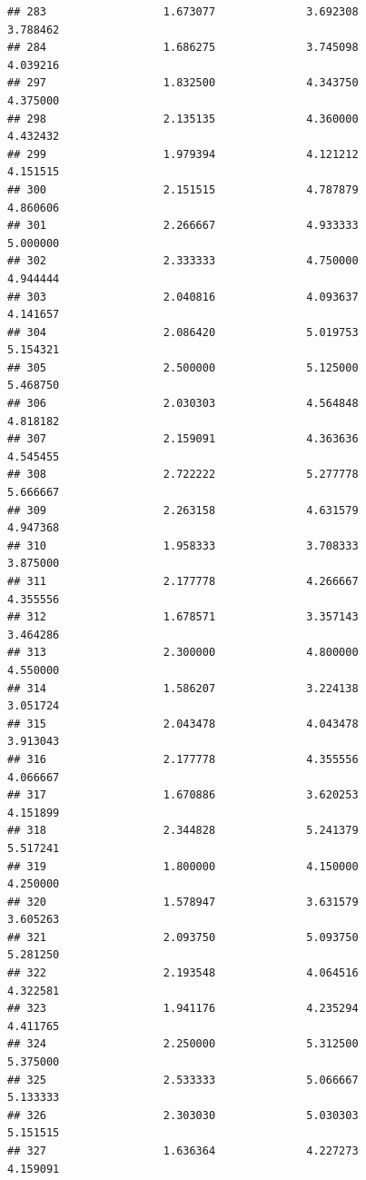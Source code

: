 \documentclass[]{article}
\begin{document}
\begin{verbatim}
## 283                  1.673077              3.692308                3.788462
## 284                  1.686275              3.745098                4.039216
## 297                  1.832500              4.343750                4.375000
## 298                  2.135135              4.360000                4.432432
## 299                  1.979394              4.121212                4.151515
## 300                  2.151515              4.787879                4.860606
## 301                  2.266667              4.933333                5.000000
## 302                  2.333333              4.750000                4.944444
## 303                  2.040816              4.093637                4.141657
## 304                  2.086420              5.019753                5.154321
## 305                  2.500000              5.125000                5.468750
## 306                  2.030303              4.564848                4.818182
## 307                  2.159091              4.363636                4.545455
## 308                  2.722222              5.277778                5.666667
## 309                  2.263158              4.631579                4.947368
## 310                  1.958333              3.708333                3.875000
## 311                  2.177778              4.266667                4.355556
## 312                  1.678571              3.357143                3.464286
## 313                  2.300000              4.800000                4.550000
## 314                  1.586207              3.224138                3.051724
## 315                  2.043478              4.043478                3.913043
## 316                  2.177778              4.355556                4.066667
## 317                  1.670886              3.620253                4.151899
## 318                  2.344828              5.241379                5.517241
## 319                  1.800000              4.150000                4.250000
## 320                  1.578947              3.631579                3.605263
## 321                  2.093750              5.093750                5.281250
## 322                  2.193548              4.064516                4.322581
## 323                  1.941176              4.235294                4.411765
## 324                  2.250000              5.312500                5.375000
## 325                  2.533333              5.066667                5.133333
## 326                  2.303030              5.030303                5.151515
## 327                  1.636364              4.227273                4.159091

\end{verbatim}
\end{document}
